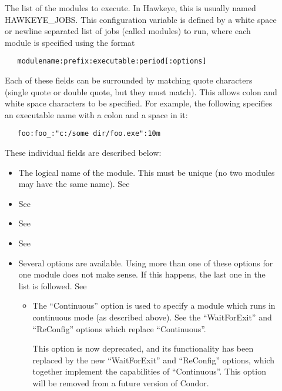 \begin{description}

\item[]
\label{param:StartdCronJobs}
  The list of the modules to execute.  In Hawkeye, this is usually
  named HAWKEYE\_JOBS.
  This configuration variable is defined by
  a white space or newline separated list of jobs (called modules) to run,
  where each module is specified using the format
\begin{verbatim}
   modulename:prefix:executable:period[:options]
\end{verbatim}
  Each of these fields can be surrounded by matching quote characters
  (single quote or double quote, but they must match).  This allows
  colon and white space characters to be specified.  For example, the
  following specifies an executable name with a colon and a space in it:
\begin{verbatim}
   foo:foo_:"c:/some dir/foo.exe":10m
\end{verbatim}
  These individual fields are described below: 
    \begin{itemize}

    \item {} The logical name of the module.  This 
    must be unique (no two modules may have the same name).  See 

    \item {}
    See 

    \item {}
    See 

    \item {}
    See 

   \item Several options are available. Using more than one
   of these options for one module does not make sense.  If this happens,
   the last one in the list is followed. 
   See 

	\begin{itemize}
	\item The ``Continuous'' option is used to specify a module
	which runs in continuous mode (as described above).  See the
	``WaitForExit'' and ``ReConfig'' options which replace
	``Continuous''.

	This option is now deprecated, and its functionality has been
	replaced by the new ``WaitForExit'' and ``ReConfig'' options,
	which together implement the capabilities of ``Continuous''.
	This option will be removed from a future version of Condor.


\end{itemize}
\end{itemize}
\end{description}
